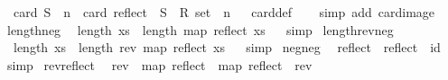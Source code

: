 \begin{isabellebody}
\ \ {\isachardoublequoteopen}{\isacharparenleft}{\kern0pt}card\ S\ {\isacharequal}{\kern0pt}\ n{\isacharparenright}{\kern0pt}\ {\isacharequal}{\kern0pt}\ {\isacharparenleft}{\kern0pt}card\ {\isacharparenleft}{\kern0pt}reflect\ {\isacharbackquote}{\kern0pt}\ {\isacharparenleft}{\kern0pt}S\ {\isacharcolon}{\kern0pt}{\isacharcolon}{\kern0pt}\ R{}\ set{\isacharparenright}{\kern0pt}{\isacharparenright}{\kern0pt}\ {\isacharequal}{\kern0pt}\ n{\isacharparenright}{\kern0pt}{\isachardoublequoteclose}%
\isadelimproof
\ %
\endisadelimproof
%
\isatagproof
{}\isamarkupfalse%
\ card{\isacharunderscore}{\kern0pt}def\isanewline
\ \ \isamarkupfalse%
\ {\isacharparenleft}{\kern0pt}simp\ add{\isacharcolon}{\kern0pt}\ card{\isacharunderscore}{\kern0pt}image{\isacharparenright}{\kern0pt}%
\endisatagproof
{\isafoldproof}%
%
\isadelimproof
%
\endisadelimproof
\isanewline
\isanewline
{}\isamarkupfalse%
\ length{\isacharunderscore}{\kern0pt}neg{\isacharcolon}{\kern0pt}\isanewline
\ \ {\isachardoublequoteopen}length\ xs\ {\isacharequal}{\kern0pt}\ length\ {\isacharparenleft}{\kern0pt}map\ reflect\ xs{\isacharparenright}{\kern0pt}{\isachardoublequoteclose}%
\isadelimproof
\ %
\endisadelimproof
%
\isatagproof
{}\isamarkupfalse%
\ simp%
\endisatagproof
{\isafoldproof}%
%
\isadelimproof
%
\endisadelimproof
\isanewline
\isanewline
{}\isamarkupfalse%
\ length{\isacharunderscore}{\kern0pt}rev{\isacharunderscore}{\kern0pt}neg{\isacharcolon}{\kern0pt}\isanewline
\ \ {\isachardoublequoteopen}length\ xs\ {\isacharequal}{\kern0pt}\ length\ {\isacharparenleft}{\kern0pt}rev\ {\isacharparenleft}{\kern0pt}map\ reflect\ xs{\isacharparenright}{\kern0pt}{\isacharparenright}{\kern0pt}{\isachardoublequoteclose}%
\isadelimproof
\ %
\endisadelimproof
%
\isatagproof
{}\isamarkupfalse%
\ simp%
\endisatagproof
{\isafoldproof}%
%
\isadelimproof
%
\endisadelimproof
\isanewline
\isanewline
{}\isamarkupfalse%
\ neg{\isacharunderscore}{\kern0pt}neg{\isacharcolon}{\kern0pt}\isanewline
\ \ {\isachardoublequoteopen}reflect\ {\isasymcirc}\ reflect\ {\isacharequal}{\kern0pt}\ id{\isachardoublequoteclose}%
\isadelimproof
\ %
\endisadelimproof
%
\isatagproof
{}\isamarkupfalse%
\ simp%
\endisatagproof
{\isafoldproof}%
%
\isadelimproof
%
\endisadelimproof
\isanewline
\isanewline
{}\isamarkupfalse%
\ rev{\isacharunderscore}{\kern0pt}reflect{\isacharcolon}{\kern0pt}\isanewline
\ \ {\isachardoublequoteopen}rev\ {\isasymcirc}\ {\isacharparenleft}{\kern0pt}map\ reflect{\isacharparenright}{\kern0pt}\ {\isacharequal}{\kern0pt}\ {\isacharparenleft}{\kern0pt}map\ reflect{\isacharparenright}{\kern0pt}\ {\isasymcirc}\ rev{\isachardoublequoteclose}\isanewline

\end{isabellebody}
